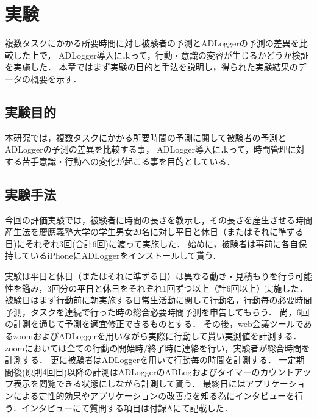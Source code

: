 \chapter{実験}
複数タスクにかかる所要時間に対し被験者の予測とADLoggerの予測の差異を比較した上で，
ADLogger導入によって，行動・意識の変容が生じるかどうか検証を実施した．
本章ではまず実験の目的と手法を説明し，得られた実験結果のデータの概要を示す．

\section{実験目的}
本研究では，複数タスクにかかる所要時間の予測に関して被験者の予測とADLoggerの予測の差異を比較する事，
ADLogger導入によって，時間管理に対する苦手意識・行動への変化が起こる事を目的としている．

\section{実験手法}
今回の評価実験では，被験者に時間の長さを教示し，その長さを産生させる時間産生法\cite{Oguro1961}\cite{Tayama2018}を慶應義塾大学の学生男女20名に対し平日と休日（またはそれに準ずる日)にそれぞれ3回(合計6回)に渡って実施した．
始めに，被験者は事前に各自保持しているiPhoneにADLoggerをインストールして貰う．

実験は平日と休日（またはそれに準ずる日）は異なる動き・見積もりを行う可能性を鑑み，3回分の平日と休日をそれぞれ1回ずつ以上（計6回以上）実施した．
被験日はまず行動前に朝実施する日常生活動に関して行動名，行動毎の必要時間予測，タスクを連続で行った時の総合必要時間予測を申告してもらう．
尚，6回の計測を通じて予測を適宜修正できるものとする．
その後，web会議ツールであるzoom\cite{zoom}およびADLoggerを用いながら実際に行動して貰い実測値を計測する．
zoomにおいては全ての行動の開始時/終了時に連絡を行い，実験者が総合時間を計測する．
更に被験者はADLoggerを用いて行動毎の時間を計測する．
一定期間後(原則4回目)以降の計測はADLoggerのADLogおよびタイマーのカウントアップ表示を閲覧できる状態にしながら計測して貰う．
最終日にはアプリケーションによる定性的効果やアプリケーションの改善点を知る為にインタビューを行う．インタビューにて質問する項目は付録Aにて記載した．


